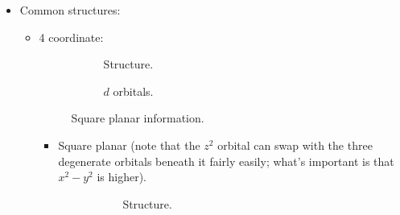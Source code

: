 \documentclass[../notes.tex]{subfiles}
\begin{document}
\begin{itemize}
\begin{enumerate}
    \end{enumerate}
    \item Common structures:
    \begin{itemize}
        \item 4 coordinate:
        \begin{figure}[H]
            \centering
            \begin{subfigure}[b]{0.3\linewidth}
                \centering
                \caption{Structure.}
                \label{fig:4-sqPlna}
            \end{subfigure}
            \begin{subfigure}[b]{0.3\linewidth}
                \centering
                \caption{$d$ orbitals.}
                \label{fig:4-sqPlnb}
            \end{subfigure}
            \caption{Square planar information.}
            \label{fig:4-sqPln}
        \end{figure}
        \begin{itemize}
            \item Square planar (note that the $z^2$ orbital can swap with the three degenerate orbitals beneath it fairly easily; what's important is that $x^2-y^2$ is higher).
            \begin{figure}[h!]
                \centering
                \begin{subfigure}[b]{0.3\linewidth}
                    \centering
                    \caption{Structure.}
                    \label{fig:4-tetraa}
                \end{subfigure}
                \begin{subfigure}[b]{0.3\linewidth}
                    \centering
                    \begin{tikzpicture}[
                        every node/.style={black}
                    ]

\end{tikzpicture}
\end{subfigure}
\end{figure}
\end{itemize}
\end{itemize}
\end{itemize}
\end{document}
